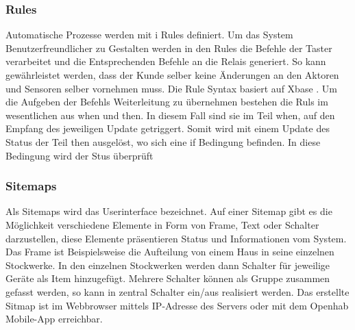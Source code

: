 \subsubsection{Rules} 
Automatische Prozesse werden mit i Rules definiert. Um das System Benutzerfreundlicher zu Gestalten werden in den Rules die Befehle der Taster verarbeitet und die Entsprechenden Befehle an die Relais generiert. So kann gewährleistet werden, dass der Kunde selber keine Änderungen an den Aktoren und Sensoren selber vornehmen muss. Die Rule Syntax basiert auf Xbase \cite{noauthor_xtext_nodate}. Um die Aufgeben der Befehls Weiterleitung zu übernehmen bestehen die Ruls im wesentlichen aus when und then. In diesem Fall sind sie im Teil when, auf den Empfang des jeweiligen Update getriggert. Somit wird mit einem Update des Status der Teil then ausgelöst, wo sich eine if Bedingung befinden. In diese Bedingung wird der Stus überprüft      

\subsubsection{Sitemaps} 

Als Sitemaps wird das Userinterface bezeichnet. Auf einer Sitemap  gibt es die Möglichkeit verschiedene Elemente in Form von Frame, Text oder Schalter darzustellen, diese Elemente präsentieren Status und Informationen vom System. Das Frame ist Beispielsweise die Aufteilung von einem Haus in seine einzelnen Stockwerke. In den einzelnen Stockwerken werden dann Schalter für jeweilige Geräte als Item hinzugefügt. Mehrere Schalter können als Gruppe zusammen gefasst werden, so kann in zentral Schalter ein/aus realisiert werden. Das erstellte Sitmap ist im Webbrowser mittels IP-Adresse des Servers oder mit dem Openhab Mobile-App erreichbar.